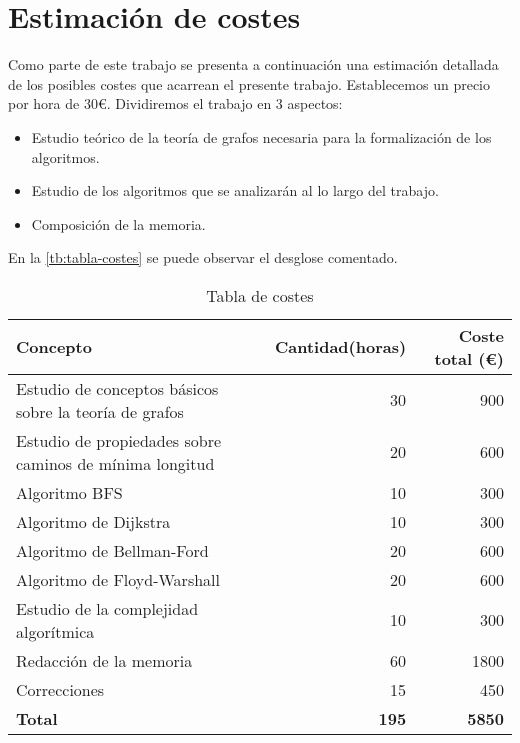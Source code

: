 
\chapter{Estimación de costes}\label{ap:apendice2}

Como parte de este trabajo se presenta a continuación una estimación detallada de los posibles costes que acarrean el presente trabajo. Establecemos un precio por hora de $30$€. Dividiremos el trabajo en $3$ aspectos:

\begin{itemize}
	\item Estudio teórico de la teoría de grafos necesaria para la formalización de los algoritmos.
	\item Estudio de los algoritmos que se analizarán al lo largo del trabajo.
	\item Composición de la memoria.
\end{itemize}

En la \autoref{tb:tabla-costes} se puede observar el desglose comentado.

\begin{table}[htpb]
	\centering
	\begin{tabular}{lrr} \toprule
		\textbf{Concepto} & \textbf{Cantidad(horas)} & \textbf{Coste total (€)}          \\ \toprule
		Estudio de conceptos básicos sobre la teoría de grafos & 30 & 900          \\ 
		Estudio de propiedades sobre caminos de mínima longitud & 20 & 600          \\ \bottomrule
		Algoritmo BFS & 10 & 300          \\ 
		Algoritmo de Dijkstra & 10 & 300          \\
		Algoritmo de Bellman-Ford & 20 & 600          \\ 
		Algoritmo de Floyd-Warshall & 20 & 600          \\
		Estudio de la complejidad algorítmica & 10 & 300          \\  \bottomrule
		Redacción de la memoria & 60 & 1800          \\ 
		Correcciones & 15 & 450          \\ \bottomrule
		\textbf{Total} & \textbf{195} & \textbf{5850}          \\ \bottomrule
	\end{tabular}
	\caption{Tabla de costes}
	\label{tb:tabla-costes}
\end{table}

\endinput
